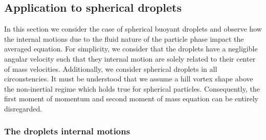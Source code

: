 
\subsection{Application to spherical droplets}
In this section we consider the case of spherical buoyant droplets and observe how the internal motions due to the fluid nature of the particle phase impact the averaged equation. 
For simplicity, we consider that the droplets have a negligible angular velocity such that they internal motion are solely related to their center of mass velocities. 
Additionally, we consider spherical droplets in all circonstencies. 
It must be understood that we assume a hill vortex shape above the non-inertial regime \cite{dandy1989} which holds true for spherical particles. 
Consequently, the first moment of momentum and second moment of mass equation can be entirely disregarded. 


\subsubsection{The droplets internal motions}

